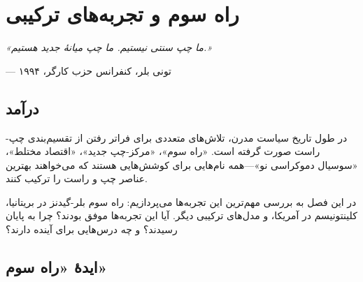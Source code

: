 \chapter{راه سوم و تجربه‌های ترکیبی}

\begin{tcolorbox}[
    enhanced,
    colback=VeryLightGray, %
    colframe=PurpleAccent, %
    boxrule=2pt,
    arc=8pt,
    fonttitle=\bfseries\large,
    title={\rl{نقل‌قول آغازین}},
    attach boxed title to top center={yshift=-3mm},
    boxed title style={colback=PurpleAccent, colframe=PurpleAccent} %
]
\begin{center}
\Large\textit{«ما چپ سنتی نیستیم. ما چپ میانهٔ جدید هستیم.»}

\vspace{3mm}
\normalsize
--- تونی بلر، کنفرانس حزب کارگر، ۱۹۹۴
\end{center}
\end{tcolorbox}

\vspace{5mm}

\section*{درآمد}


در طول تاریخ سیاست مدرن، تلاش‌های متعددی برای فراتر رفتن از تقسیم‌بندی چپ-راست صورت گرفته است. «راه سوم»، «مرکز-چپ جدید»، «اقتصاد مختلط»، «سوسیال دموکراسی نو»—همه نام‌هایی برای کوشش‌هایی هستند که می‌خواهند بهترین عناصر چپ و راست را ترکیب کنند.

در این فصل به بررسی مهم‌ترین این تجربه‌ها می‌پردازیم: راه سوم بلر-گیدنز در بریتانیا، کلینتونیسم در آمریکا، و مدل‌های ترکیبی دیگر. آیا این تجربه‌ها موفق بودند؟ چرا به پایان رسیدند؟ و چه درس‌هایی برای آینده دارند؟


\section{ایدهٔ «راه سوم»}

